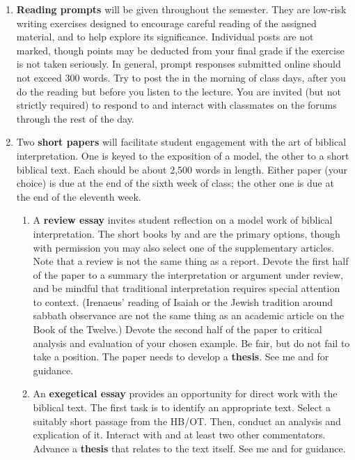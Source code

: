 \documentclass[titlepage]{article}
\begin{document}
\begin{enumerate}

	\item \textbf{Reading prompts} will be given throughout the
	semester. They are low-risk writing exercises designed to encourage
	careful reading of the assigned material, and to help explore its
	significance. Individual posts are not marked, though points may be
	deducted from your final grade if the exercise is not taken
	seriously. In general, prompt responses submitted online should not
	exceed 300 words. Try to post the in the morning of class days,
	after you do the reading but before you listen to the lecture. You
	are invited (but not strictly required) to respond to and interact
	with classmates on the forums through the rest of the day.

	\item Two \textbf{short papers} will facilitate student engagement
	with the art of biblical interpretation. One is keyed to the
	exposition of a model, the other to a short biblical text. Each
	should be about 2,500 words in length. Either paper (your choice) is
	due at the end of the sixth week of class; the other one is due at
	the end of the eleventh week.

	\begin{enumerate}

		\item A \textbf{review essay} invites student reflection on a
		model work of biblical interpretation. The short books by
		\cite{heschel} and \cite{irenaeus} are the primary options,
		though with permission you may also select one of the
		supplementary articles. Note that a review is not the same thing
		as a report. Devote the first half of the paper to a summary the
		interpretation or argument under review, and be mindful that
		traditional interpretation requires special attention to
		context. (Irenaeus' reading of Isaiah or the Jewish tradition
		around sabbath observance are not the same thing as an academic
		article on the Book of the Twelve.) Devote the second half of
		the paper to critical analysis and evaluation of your chosen
		example. Be fair, but do not fail to take a position. The paper
		needs to develop a \textbf{thesis}. See me and \cite[Chs 3, 5–7,
		11]{rlgs} for guidance.

		\item An \textbf{exegetical essay} provides an opportunity for
		direct work with the biblical text. The first task is to
		identify an appropriate text. Select a suitably short passage
		from the HB/OT. Then, conduct an analysis and explication of it.
		Interact with \cite{hbfb} and at least two other commentators.
		Advance a \textbf{thesis} that relates to the text itself. See
		me and \cite[Chs 3, 5, 8, 11]{rlgs} for guidance.


\end{enumerate}
\end{enumerate}
\end{document}
